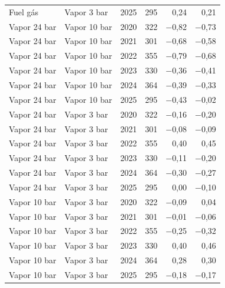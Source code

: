 {\begin{xltabular}{\linewidth}{@{}lllrrr@{}}
Fuel gás & Vapor 3 bar & 2025 & 295 & 0,24 & 0,21 \\
Vapor 24 bar & Vapor 10 bar & 2020 & 322 & $-$0,82 & $-$0,73 \\
Vapor 24 bar & Vapor 10 bar & 2021 & 301 & $-$0,68 & $-$0,58 \\
Vapor 24 bar & Vapor 10 bar & 2022 & 355 & $-$0,79 & $-$0,68 \\
Vapor 24 bar & Vapor 10 bar & 2023 & 330 & $-$0,36 & $-$0,41 \\
Vapor 24 bar & Vapor 10 bar & 2024 & 364 & $-$0,39 & $-$0,33 \\
Vapor 24 bar & Vapor 10 bar & 2025 & 295 & $-$0,43 & $-$0,02 \\
Vapor 24 bar & Vapor 3 bar & 2020 & 322 & $-$0,16 & $-$0,20 \\
Vapor 24 bar & Vapor 3 bar & 2021 & 301 & $-$0,08 & $-$0,09 \\
Vapor 24 bar & Vapor 3 bar & 2022 & 355 & 0,40 & 0,45 \\
Vapor 24 bar & Vapor 3 bar & 2023 & 330 & $-$0,11 & $-$0,20 \\
Vapor 24 bar & Vapor 3 bar & 2024 & 364 & $-$0,30 & $-$0,27 \\
Vapor 24 bar & Vapor 3 bar & 2025 & 295 & 0,00 & $-$0,10 \\
Vapor 10 bar & Vapor 3 bar & 2020 & 322 & $-$0,09 & 0,04 \\
Vapor 10 bar & Vapor 3 bar & 2021 & 301 & $-$0,01 & $-$0,06 \\
Vapor 10 bar & Vapor 3 bar & 2022 & 355 & $-$0,25 & $-$0,32 \\
Vapor 10 bar & Vapor 3 bar & 2023 & 330 & 0,40 & 0,46 \\
Vapor 10 bar & Vapor 3 bar & 2024 & 364 & 0,28 & 0,30 \\
Vapor 10 bar & Vapor 3 bar & 2025 & 295 & $-$0,18 & $-$0,17 \\
\end{xltabular}
}
